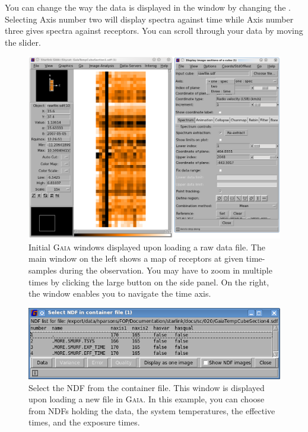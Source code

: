 \documentclass[11pt,oneside,chapters]{starlink}
\begin{document}
You can change the way the data is displayed in the  window by changing the .
Selecting Axis number two will display spectra against time while Axis
number three gives spectra against receptors. You can scroll through
your data by moving the  slider.

\begin{figure}[h!]
\begin{center}
\includegraphics[width=0.9\linewidth]{sc20_gaia1}
\caption[\gaia\ main window.]{\label{fig:rawgaia}
  Initial \textsc{Gaia} windows displayed upon loading a raw
  data file. The main window on the left shows a map of receptors at
  given time-samples during the observation. You may have to zoom in
  multiple times by clicking the large  button on the side
  panel. On the right, the 
  window enables you to navigate the time axis.}
\end{center}
\end{figure}


\begin{figure}[h!]
\begin{center}
\includegraphics[width=0.7\linewidth]{sc20_gaia3}
\caption[\gaia\ select NDF in container file]{\label{fig:ndfgaia}
  Select the NDF from the container file.  This window is displayed upon
  loading a new file in \textsc{Gaia}.  In this example, you can choose
  from NDFs holding the data, the system temperatures, the effective
  times, and the exposure times.}
\end{center}
\end{figure}
\end{document}
